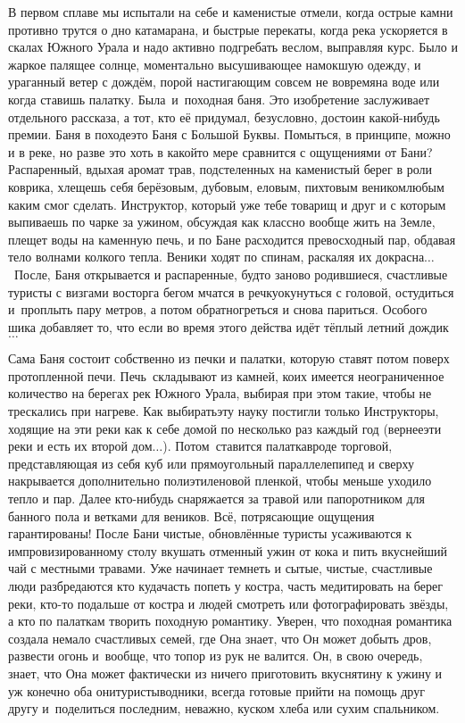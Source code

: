 В первом сплаве мы испытали на себе и каменистые отмели, когда острые камни противно трутся о дно катамарана, и быстрые перекаты, когда река ускоряется в скалах Южного Урала и надо активно подгребать веслом, выправляя курс. Было и жаркое палящее солнце, моментально высушивающее намокшую одежду, и ураганный ветер с дождём, порой настигающим совсем не вовремя\mdash на воде или когда ставишь палатку. Была~и~походная баня. Это изобретение заслуживает отдельного рассказа, а тот, кто её придумал, безусловно, достоин какой-нибудь премии.
\newpage
Баня в походе\mdash это Баня с Большой Буквы. Помыться, в принципе, можно и в реке, но разве это хоть в какой\sdash то мере сравнится с ощущениями от Бани? Распаренный, вдыхая аромат трав, подстеленных на каменистый берег в роли коврика, хлещешь себя берёзовым, дубовым, еловым, пихтовым веником\mdash любым каким смог сделать. Инструктор, который уже тебе товарищ и друг и с которым выпиваешь по чарке за ужином, обсуждая как классно вообще жить на Земле, плещет воды на каменную печь, и по Бане расходится превосходный пар, обдавая тело волнами колкого тепла. Веники ходят по спинам, раскаляя их докрасна$\ldots$~После, Баня открывается и распаренные, будто заново родившиеся, счастливые туристы с визгами восторга бегом мчатся в речку\mdash окунуться с головой, остудиться и~проплыть пару метров, а потом обратно\mdash греться и снова париться. Особого шика добавляет то, что если во время этого действа идёт тёплый летний дождик$\ldots$  

Сама Баня состоит собственно из печки и палатки, которую ставят потом поверх протопленной печи. Печь~складывают из камней, коих имеется неограниченное количество на берегах рек Южного Урала, выбирая при этом такие, чтобы не трескались при нагреве. Как выбирать\mdash эту науку постигли только Инструкторы, ходящие на эти реки как к себе домой по несколько раз каждый год (вернее\mdash эти реки и есть их второй дом$\ldots$). Потом~ставится палатка\mdash вроде торговой, представляющая из себя куб или прямоугольный параллелепипед и сверху накрывается дополнительно полиэтиленовой пленкой, чтобы меньше уходило тепло и пар. Далее кто-нибудь снаряжается за травой или папоротником для банного пола и ветками для веников. Всё, потрясающие ощущения гарантированы!
\newpage
После Бани чистые, обновлённые туристы усаживаются к импровизированному столу вкушать отменный ужин от кока и пить вкуснейший чай с местными травами. Уже начинает темнеть и сытые, чистые, счастливые люди разбредаются кто куда\mdash часть попеть у костра, часть медитировать на берег реки, кто-то подальше от костра и людей смотреть или фотографировать звёзды, а кто по палаткам творить походную романтику. Уверен, что походная романтика создала немало счастливых семей, где Она знает, что Он может добыть дров, развести огонь и~вообще, что топор из рук не валится. Он, в свою очередь, знает, что Она может фактически из ничего приготовить вкуснятину к ужину и уж конечно оба они\mdash туристы\sdash водники, всегда готовые прийти на помощь друг другу и~поделиться последним, неважно, куском хлеба или сухим спальником. 

